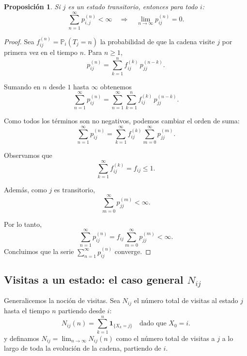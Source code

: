 \documentclass[12pt]{book}
\newtheorem{proposition}{Proposición}[chapter]
\begin{document}
\begin{proposition}
Si $j$ es un estado transitorio, entonces para todo $i$:
\[
\sum_{n=1}^\infty p_{i,j}^{(n)} < \infty \quad \Rightarrow \quad \lim_{n \to \infty} p_{ij}^{(n)} = 0.
\]
\end{proposition}
\begin{proof}
Sea $f_{ij}^{(n)}=\mathbb{P}_i(T_j=n)$ la probabilidad de que la cadena visite
$j$ por primera vez en el tiempo $n$. Para $n\ge1$,
\[
p_{ij}^{(n)}=\sum_{k=1}^{n} f_{ij}^{(k)}\, p_{jj}^{(n-k)} .
\]

Sumando en $n$ desde $1$ hasta $\infty$ obtenemos
\[
\sum_{n=1}^{\infty} p_{ij}^{(n)}
  = \sum_{n=1}^{\infty}\sum_{k=1}^{n} f_{ij}^{(k)}\, p_{jj}^{(n-k)}.
\]

Como todos los términos son no negativos, podemos cambiar el orden de suma:
\[
\sum_{n=1}^{\infty} p_{ij}^{(n)}
= \sum_{k=1}^{\infty} f_{ij}^{(k)} 
  \sum_{m=0}^{\infty} p_{jj}^{(m)} .
\]

Observamos que
\[
\sum_{k=1}^{\infty} f_{ij}^{(k)} = f_{ij} \le 1 .
\]

Además, como $j$ es transitorio,
\[
\sum_{m=0}^{\infty} p_{jj}^{(m)} < \infty .
\]

Por lo tanto,
\[
\sum_{n=1}^{\infty} p_{ij}^{(n)}
= f_{ij}\sum_{m=0}^{\infty} p_{jj}^{(m)} < \infty .
\]
Concluimos que la serie $\sum_{n=1}^{\infty} p_{ij}^{(n)}$ converge.
\end{proof}


\subsection[Visitas a un estado: el caso general Nij]{Visitas a un estado: el caso general $N_{ij}$}

Generalicemos la noción de visitas. Sea $N_{ij}$ el número total de visitas al estado $j$ hasta el tiempo $n$ partiendo desde $i$:
\[
N_{ij}(n) = \sum_{k=1}^{n} \mathbf{1}_{\{X_k = j\}} \quad \text{dado que } X_0 = i.
\]
y definamos $N_{ij} = \lim_{n \to \infty} N_{ij}(n)$ como el número total de visitas a $j$ a lo largo de toda la evolución de la cadena, partiendo de $i$.
\end{document}
